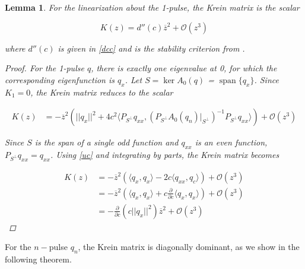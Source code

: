 \documentclass[12pt]{article}
\DeclareMathOperator{\spn}{span}
\newtheorem{lemma}{Lemma}
\begin{document}

\begin{lemma}\label{Krein1pulse}
For the linearization about the 1-pulse, the Krein matrix is the scalar

\begin{equation}
K(z) = d''(c) \overline{z}^2 + \mathcal{O}(z^3)
\end{equation}

where $d''(c)$ is given in \eqref{dcc} and is the stability criterion from \cite{Grillakis1987}.

\begin{proof}
For the 1-pulse $q$, there is exactly one eigenvalue at 0, for which the corresponding eigenfunction is $q_x$. Let $S = \ker A_0(q)$ = $\spn \{q_x\}$. Since $K_1 = 0$, the Krein matrix reduces to the scalar

\begin{align*}
K(z) &= -\overline{z}^2 \left( ||q_x||^2 + 4 c^2 \langle P_{S^\perp} q_{xx}, (P_{S^\perp} A_0(q_n)|_{S^\perp})^{-1} P_{S^\perp} q_{xx} \rangle \right) + \mathcal{O}(z^3)
\end{align*}

Since $S$ is the span of a single odd function and $q_{xx}$ is an even function, $P_{S^\perp} q_{xx} = q_{xx}$. Using \eqref{uc} and integrating by parts, the Krein matrix becomes

\begin{align*}
K(z) &= -\overline{z}^2 \left( \langle q_x, q_x \rangle - 2c \langle q_{xx}, q_c \rangle \right) + \mathcal{O}(z^3) \\
&= -\overline{z}^2 \left( \langle q_x, q_x \rangle + c \frac{\partial}{\partial c}\langle q_x, q_x \rangle \right) + \mathcal{O}(z^3)  \\
&= -\frac{\partial}{\partial c} \left( c||q_x||^2 \right) \overline{z}^2  + \mathcal{O}(z^3) 
\end{align*}

\end{proof}
\end{lemma}

For the $n-$pulse $q_n$, the Krein matrix is diagonally dominant, as we show in the following theorem.

\end{document}
